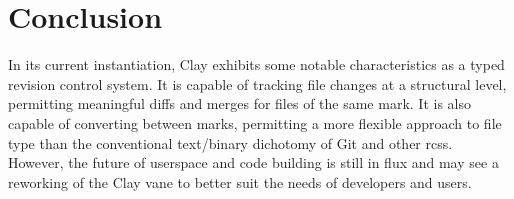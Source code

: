 \documentclass[twoside]{article}
\begin{document}
\section{Conclusion}

In its current instantiation, Clay exhibits some notable characteristics as a typed revision control system.  It is capable of tracking file changes at a structural level, permitting meaningful diffs and merges for files of the same mark.  It is also capable of converting between marks, permitting a more flexible approach to file type than the conventional text/binary dichotomy of Git and other {\sc rcs}s.  However, the future of userspace and code building is still in flux and may see a reworking of the Clay vane to better suit the needs of developers and users.

\printbibliography
\end{document}
